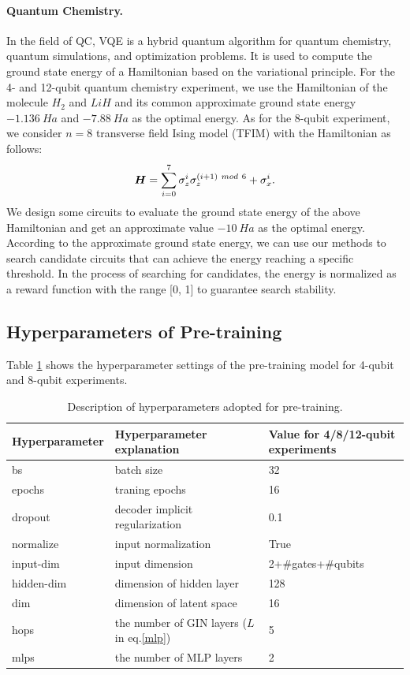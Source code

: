 \documentclass{article} %
\begin{document}
\paragraph{Quantum Chemistry.} In the field of QC, VQE \citep{peruzzo2014variational, tilly2022variational} is a hybrid quantum algorithm for quantum chemistry, quantum simulations, and optimization problems. It is used to compute the ground state energy of a Hamiltonian based on the variational principle. For the 4- and 12-qubit quantum chemistry experiment, we use the Hamiltonian of the molecule $H_2$ and $LiH$ and its common approximate ground state energy $-1.136 \ Ha$ and $-7.88 \ Ha$ as the optimal energy. As for the 8-qubit experiment, we consider $n=8$ transverse field Ising model (TFIM) with the Hamiltonian as follows:
\begin{align}
    {\bm{H}} = 
    \sum_{i=0}^7\sigma_z^i\sigma_z^{(i+1) \ mod \ 6} + \sigma_x^i\text{.}
\end{align}
We design some circuits to evaluate the ground state energy of the above Hamiltonian and get an approximate value $-10 \ Ha$ as the optimal energy. According to the approximate ground state energy, we can use our methods to search candidate circuits that can achieve the energy reaching a specific threshold. In the process of searching for candidates, the energy is normalized as a reward function with the range [0, 1] to guarantee search stability.

\subsection{Hyperparameters of Pre-training}
\label{pretraining_parameters}
Table \ref{table:appendix Description of hp} shows the hyperparameter settings of the pre-training model for 4-qubit and 8-qubit experiments.
\begin{table}[ht]
\centering
     \caption{Description of hyperparameters adopted for pre-training.}
    \begin{tabular}{p{}p{}p{}}
    \hline
     Hyperparameter & Hyperparameter explanation & Value for 4/8/12-qubit experiments\\
    \hline
    bs & batch size & 32\\
    epochs & traning epochs & 16\\
    dropout & decoder implicit regularization & 0.1\\
    normalize & input normalization & True\\
    input-dim & input dimension & 2+$\#$gates+$\#$qubits\\
    hidden-dim & dimension of hidden layer & 128\\
    dim & dimension of latent space & 16\\
    hops & the number of GIN layers ($L$ in eq.\ref{mlp}) & 5 \\
    mlps & the number of MLP layers & 2 \\
    \bottomrule
  \end{tabular}
\label{table:appendix Description of hp}
\end{table}
\end{document}
